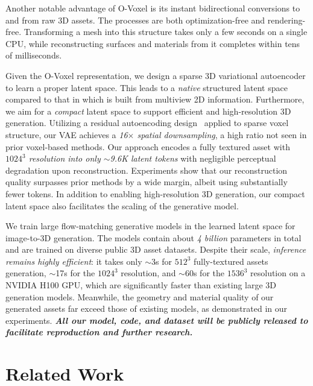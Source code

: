 \documentclass[10pt,twocolumn,letterpaper]{article}
\begin{document}
Another notable advantage of O-Voxel is its instant bidirectional conversions to and from raw 3D assets. The processes are both optimization-free and rendering-free. Transforming a mesh into this structure takes only a few seconds on a single CPU, while reconstructing surfaces and materials from it completes within tens of milliseconds.

Given the O-Voxel representation, we design a sparse 3D variational autoencoder to learn a proper latent space. This leads to a \emph{native} structured latent space compared to that in \cite{xiang2025structured} which is built from multiview 2D information. Furthermore, we aim for a \emph{compact} latent space to support efficient and high-resolution 3D generation. 
Utilizing a residual autoencoding design~\cite{chen2024deep} applied to  sparse voxel structure, our VAE achieves a \emph{16$\times$ spatial downsampling}, a high ratio not seen in prior voxel-based methods. Our approach encodes a fully textured asset with \emph{$\textrm{1024}^\textrm{3}$ resolution into only $\sim$9.6K latent tokens} with negligible perceptual degradation upon reconstruction. Experiments show that our reconstruction quality surpasses prior methods by a wide margin, albeit using substantially fewer tokens. In addition to enabling  high-resolution 3D generation, our compact latent space also facilitates the scaling of the generative model. 


We train large flow-matching generative models in the learned latent space for image-to-3D generation. 
The models contain about \emph{4 billion} parameters in total and are trained on diverse public 3D asset datasets. Despite their scale, \emph{inference remains highly efficient}: it takes only $\sim$3s for $512^3$ fully-textured assets generation, $\sim$17s for the $1024^3$ resolution, and $\sim$60s for the $1536^3$ resolution on a NVIDIA H100 GPU, which are significantly faster than existing large 3D generation models. Meanwhile, the geometry and material quality of our generated assets far exceed those of existing models, as demonstrated in our experiments. 
\textbf{\emph{All our model, code, and dataset will be publicly released to facilitate reproduction and further research.}}


\section{Related Work}
\end{document}
